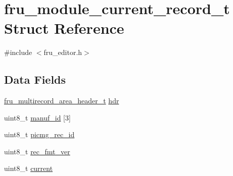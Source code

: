 \hypertarget{structfru__module__current__record__t}{\section{fru\-\_\-module\-\_\-current\-\_\-record\-\_\-t Struct Reference}
\label{structfru__module__current__record__t}
}


{\ttfamily \#include $<$fru\-\_\-editor.\-h$>$}

\subsection*{Data Fields}
\begin{DoxyCompactItemize}
\item 
\hyperlink{fru__editor_8h_ad6ac8d0278f7506c13b930cb39a818b3}{fru\-\_\-multirecord\-\_\-area\-\_\-header\-\_\-t} \hyperlink{structfru__module__current__record__t_ab5aa1614cd89ae904256768b23cce6e8}{hdr}
\item 
uint8\-\_\-t \hyperlink{structfru__module__current__record__t_a54c1e85f0cb333047329b72872c0158f}{manuf\-\_\-id} \mbox{[}3\mbox{]}
\item 
uint8\-\_\-t \hyperlink{structfru__module__current__record__t_a2d94516532b599204e5aafb709342d3e}{picmg\-\_\-rec\-\_\-id}
\item 
uint8\-\_\-t \hyperlink{structfru__module__current__record__t_a103d214aa7283a502186aa8d2122d39a}{rec\-\_\-fmt\-\_\-ver}
\item 
uint8\-\_\-t \hyperlink{structfru__module__current__record__t_aac6fc42e5de7fdb3d7c01d0c2509ba25}{current}
\end{DoxyCompactItemize}



